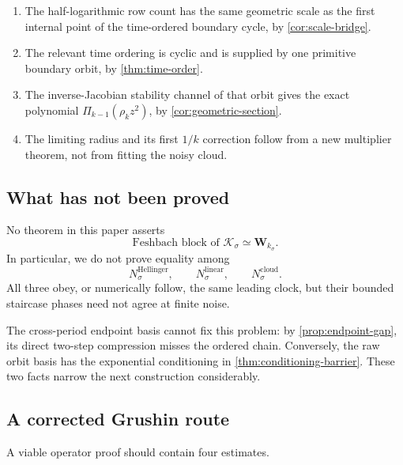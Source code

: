 \documentclass[11pt]{article}
\theoremstyle{definition}
\theoremstyle{remark}
\newcommand{\bW}{\mathbf W}
\newcommand{\cK}{\mathcal K}
\begin{document}
\begin{enumerate}[label=(\roman*),leftmargin=2.5em]
 \item The half-logarithmic row count has the same geometric scale as the
 first internal point of the time-ordered boundary cycle, by
 \cref{cor:scale-bridge}.
 \item The relevant time ordering is cyclic and is supplied by one primitive
 boundary orbit, by \cref{thm:time-order}.
 \item The inverse-Jacobian stability channel of that orbit gives the exact
 polynomial $\Pi_{k-1}(\rho_kz^2)$, by
 \cref{cor:geometric-section}.
 \item The limiting radius and its first $1/k$ correction follow from a new
 multiplier theorem, not from fitting the noisy cloud.
\end{enumerate}

\subsection{What has not been proved}

No theorem in this paper asserts
\begin{equation}\label{eq:not-feshbach}
 \text{Feshbach block of }\cK_\sigma
 \simeq \bW_{k_\sigma}.
\end{equation}
In particular, we do not prove equality among
\begin{equation}\label{eq:three-integers}
 N_\sigma^{\mathrm{Hellinger}},
 \qquad N_\sigma^{\mathrm{linear}},
 \qquad N_\sigma^{\mathrm{cloud}}.
\end{equation}
All three obey, or numerically follow, the same leading clock, but their
bounded staircase phases need not agree at finite noise.

The cross-period endpoint basis cannot fix this problem: by
\cref{prop:endpoint-gap}, its direct two-step compression misses the ordered
chain.  Conversely, the raw orbit basis has the exponential conditioning in
\cref{thm:conditioning-barrier}.  These two facts narrow the next
construction considerably.

\subsection{A corrected Grushin route}

A viable operator proof should contain four estimates.
\end{document}

